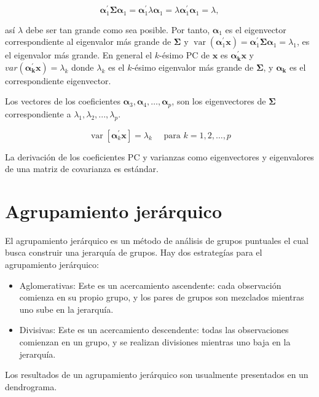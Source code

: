 \[
\boldsymbol{\alpha}_{1}^{\prime} \boldsymbol{\Sigma} \boldsymbol{\alpha}_{1}=\boldsymbol{\alpha}_{1}^{\prime} \lambda \boldsymbol{\alpha}_{1}=\lambda \boldsymbol{\alpha}_{1}^{\prime} \boldsymbol{\alpha}_{1}=\lambda,
\]

así $\lambda$ debe ser tan grande como sea posible. Por tanto, $\boldsymbol{\alpha}_{1}$ es el eigenvector correspondiente al eigenvalor más grande de $\boldsymbol{\Sigma}$ y $\operatorname{var}\left(\boldsymbol{\alpha}_{1}^{\prime} \mathbf{x}\right)=\boldsymbol{\alpha}_{1}^{\prime} \boldsymbol{\Sigma} \boldsymbol{\alpha}_{1}=\lambda_{1}$, es el eigenvalor más grande.
En general el $k$-ésimo PC de $\boldsymbol{x}$ es $ \boldsymbol{\alpha_k^\prime} \boldsymbol{x}$ y $var(\boldsymbol{\alpha_k^\prime}\boldsymbol{x})=\lambda_k$ donde $\lambda_k$ es el $k$-ésimo eigenvalor más grande de $\boldsymbol{\Sigma}$, y $\boldsymbol{\alpha_k}$ es el correspondiente eigenvector.

Los vectores de los coeficientes $\boldsymbol{\alpha}_{3}, \boldsymbol{\alpha}_{4}, \ldots, \boldsymbol{\alpha}_{p}$, son los eigenvectores de $\boldsymbol{\Sigma}$ correspondiente a $\lambda_{1},\lambda_{2},...,\lambda_{p}$.

\[
\operatorname{var}\left[\boldsymbol{\alpha}_{k}^{\prime} \mathbf{x}\right]=\lambda_{k} \quad \text { para } k=1,2, \ldots, p
\]

La derivación de los coeficientes PC y varianzas como eigenvectores y eigenvalores de una matriz de covarianza es estándar. 

\section{Agrupamiento jerárquico}
El agrupamiento jerárquico es un método de análisis de grupos puntuales el cual busca construir una jerarquía de grupos.
Hay dos estrategías para el agrupamiento jerárquico:
\begin{itemize}
	\item Aglomerativas: Este es un acercamiento ascendente: cada observación comienza en su propio grupo, y los pares de grupos son mezclados mientras uno sube en la jerarquía.
	\item Divisivas: Este es un acercamiento descendente: todas las observaciones comienzan en un grupo, y se realizan divisiones mientras uno baja en la jerarquía.
\end{itemize}

Los resultados de un agrupamiento jerárquico son usualmente presentados en un dendrograma. 

